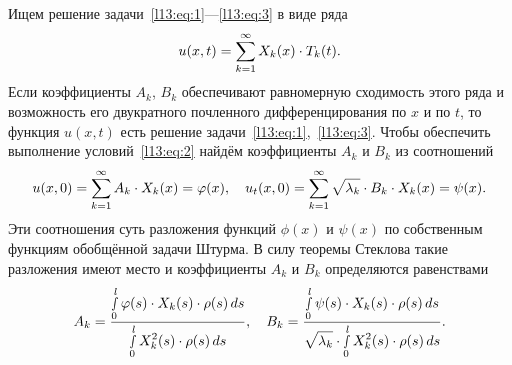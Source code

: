 \documentclass[12pt,a4paper,openany,fleqn]{book}
\theoremstyle{definition}
\begin{document}
	Ищем решение задачи~\eqref{l13:eq:1}---\eqref{l13:eq:3} в виде ряда
	\begin{equation*}
		\hfill u(x,t)=\sum\limits_{k=1}^{\infty}X_k(x)\cdot T_k(t).\hfill
	\end{equation*}
	Если коэффициенты $A_k$, $B_k$ обеспечивают равномерную сходимость этого ряда и возможность его двукратного почленного дифференцирования по $x$ и по $t$, то функция $u(x,t)$ есть решение задачи~\eqref{l13:eq:1},~\eqref{l13:eq:3}. Чтобы обеспечить выполнение условий~\eqref{l13:eq:2} найдём коэффициенты $A_k$ и $B_k$ из соотношений 
	\begin{equation*}
		\hfill u(x,0)=\sum\limits_{k=1}^{\infty}A_k\cdot X_k(x)=\phi(x),\quad u_t(x,0)=\sum\limits_{k=1}^{\infty}\sqrt{\lambda_k}\cdot B_k\cdot X_k(x)=\psi(x). \hfill
	\end{equation*}
	Эти соотношения суть разложения функций $\phi(x)$ и $\psi(x)$ по собственным функциям обобщённой задачи Штурма. В силу теоремы Стеклова такие разложения имеют место и коэффициенты $A_k$ и $B_k$ определяются равенствами
	\begin{equation*}
		\hfill A_k=\frac{\displaystyle\smallint\limits_0^l\phi(s)\cdot X_k(s)\cdot\rho(s)\,ds}{\displaystyle\smallint\limits_0^l X^2_k(s)\cdot\rho(s)\,ds},\quad B_k=\frac{\displaystyle\smallint\limits_0^l\psi(s)\cdot X_k(s)\cdot\rho(s)\,ds}{\displaystyle\sqrt{\lambda_k}\cdot\smallint\limits_0^l X^2_k(s)\cdot\rho(s)\,ds}.\hfill
	\end{equation*}
\end{document}
